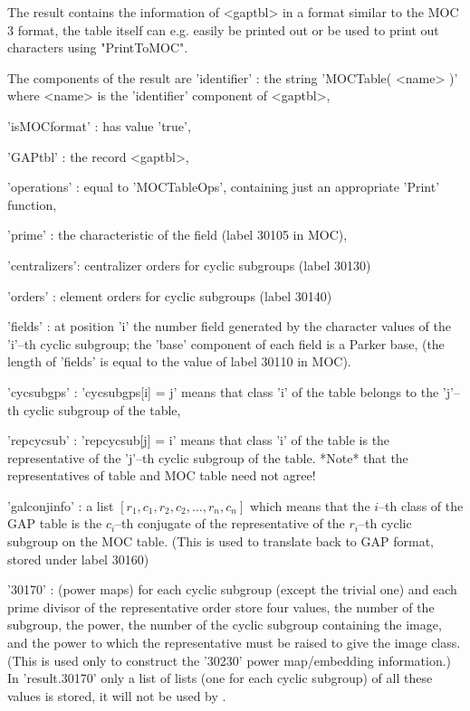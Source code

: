The result contains the information of <gaptbl> in a format similar to
the MOC 3 format, the table itself can e.g. easily be printed out or be
used to print out characters using "PrintToMOC".

The components of the result are
'identifier'  : the string 'MOCTable( <name> )' where <name> is the
                'identifier' component of <gaptbl>,

'isMOCformat' : has value 'true',

'GAPtbl'      : the record <gaptbl>,

'operations'  : equal to 'MOCTableOps', containing just an appropriate
                'Print' function,

'prime'       : the characteristic of the field (label 30105 in MOC),

'centralizers': centralizer orders for cyclic subgroups (label 30130)

'orders'      : element orders for cyclic subgroups (label 30140)

'fields'      : at position 'i' the number field generated by the
                character values of the 'i'--th cyclic subgroup;
                the 'base' component of each field is a Parker base,
                (the length of 'fields' is equal to the value of label
                30110 in MOC).

'cycsubgps'   : 'cycsubgps[i] = j' means that class 'i' of
                the {\GAP} table belongs to the 'j'--th cyclic subgroup
                of the {\GAP} table,

'repcycsub'   : 'repcycsub[j] = i' means that class 'i' of
                the {\GAP} table is the representative of
                the 'j'--th cyclic subgroup of the {\GAP} table.
                *Note* that the representatives of {\GAP} table and
                MOC table need not agree!

'galconjinfo' : a list $[ r_1,c_1,r_2,c_2,\ldots,r_n,c_n ]$
                which means that the $i$--th class of the GAP table is
                the $c_i$--th conjugate of the representative of
                the $r_i$--th cyclic subgroup on the MOC table.
                (This is used to translate back to GAP format,
                stored under label 30160)

'30170'       : (power maps) for each cyclic subgroup (except
                the trivial one) and each prime divisor of
                the representative order store four values, the number
                of the subgroup, the power, the number of the cyclic
                subgroup containing the image, and the power to which
                the representative must be raised to give the image
                class.  (This is used only to construct the '30230'
                power map/embedding information.)
                In 'result.30170' only a list of lists (one for each
                cyclic subgroup) of all these values is stored,
                it will not be used by {\GAP}.

